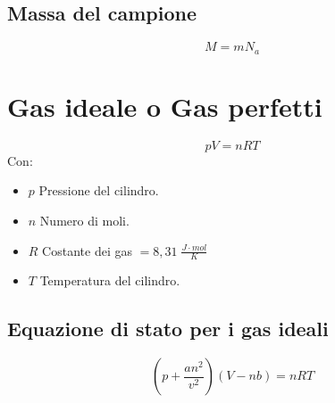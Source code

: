         \subsection{Massa del campione}
            \begin{equation}
                M = mN_a
            \end{equation}
    
    \section{Gas ideale o Gas perfetti}
        \begin{equation}
            pV = nRT
        \end{equation}
    Con:
        \begin{itemize}
            \item $p$ Pressione del cilindro.
            \item $n$ Numero di moli.
            \item $R$ Costante dei gas $= 8,31 \; \frac{J \cdot mol}{K}$
            \item $T$ Temperatura del cilindro.
        \end{itemize}
        \subsection{Equazione di stato per i gas ideali}
            \begin{equation}
                (p + \frac{an^2}{v^2})(V - nb) = nRT
            \end{equation}